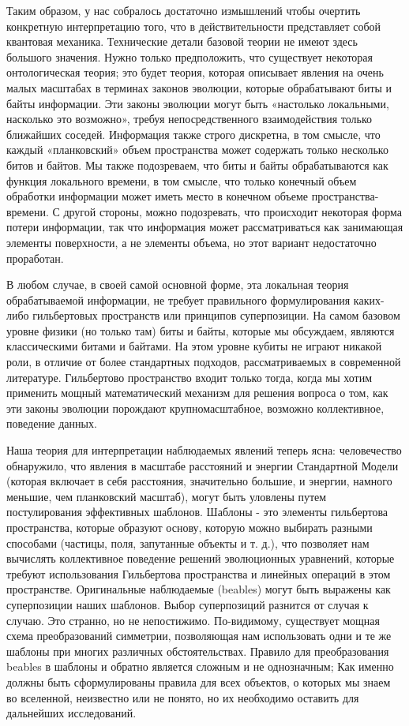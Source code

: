 \documentclass[main.tex]{subfiles}
\begin{document}
Таким образом, у нас собралось достаточно измышлений чтобы очертить конкретную интерпретацию того, что в действительности представляет собой квантовая механика. Технические детали базовой теории не имеют здесь большого значения. Нужно только предположить, что существует некоторая онтологическая теория; это будет теория, которая описывает явления на очень малых масштабах в терминах законов эволюции, которые обрабатывают биты и байты информации. Эти законы эволюции могут быть «настолько локальными, насколько это возможно», требуя непосредственного взаимодействия только ближайших соседей. Информация также строго дискретна, в том смысле, что каждый «планковский» объем пространства может содержать только несколько битов и байтов. Мы также подозреваем, что биты и байты обрабатываются как функция локального времени, в том смысле, что только конечный объем обработки информации может иметь место в конечном объеме пространства-времени. С другой стороны, можно подозревать, что происходит некоторая форма потери информации, так что информация может рассматриваться как занимающая элементы поверхности, а не элементы объема, но этот вариант недостаточно проработан.

В любом случае, в своей самой основной форме, эта локальная теория обрабатываемой информации, не требует правильного формулирования каких-либо гильбертовых пространств или принципов суперпозиции. На самом базовом уровне физики (но только там) биты и байты, которые мы обсуждаем, являются классическими битами и байтами. На этом уровне кубиты не играют никакой роли, в отличие от более стандартных подходов, рассматриваемых в современной литературе. Гильбертово пространство входит только тогда, когда мы хотим применить мощный математический механизм для решения вопроса о том, как эти законы эволюции порождают крупномасштабное, возможно коллективное, поведение данных.

Наша теория для интерпретации наблюдаемых явлений теперь ясна: человечество обнаружило, что явления в масштабе расстояний и энергии Стандартной Модели (которая включает в себя расстояния, значительно большие, и энергии, намного меньшие, чем планковский масштаб), могут быть уловлены путем постулирования эффективных шаблонов. Шаблоны - это элементы гильбертова пространства, которые образуют основу, которую можно выбирать разными способами (частицы, поля, запутанные объекты и т. д.), что позволяет нам вычислять коллективное поведение решений эволюционных уравнений, которые требуют использования Гильбертова пространства и линейных операций в этом пространстве. Оригинальные наблюдаемые (beables) могут быть выражены как суперпозиции наших шаблонов. Выбор суперпозиций разнится от случая к случаю. Это странно, но не непостижимо. По-видимому, существует мощная схема преобразований симметрии, позволяющая нам использовать одни и те же шаблоны при многих различных обстоятельствах. Правило для преобразования beables в шаблоны и обратно является сложным и не однозначным; Как именно должны быть сформулированы правила для всех объектов, о которых мы знаем во вселенной, неизвестно или не понято, но их необходимо оставить для дальнейших исследований.
\end{document}

